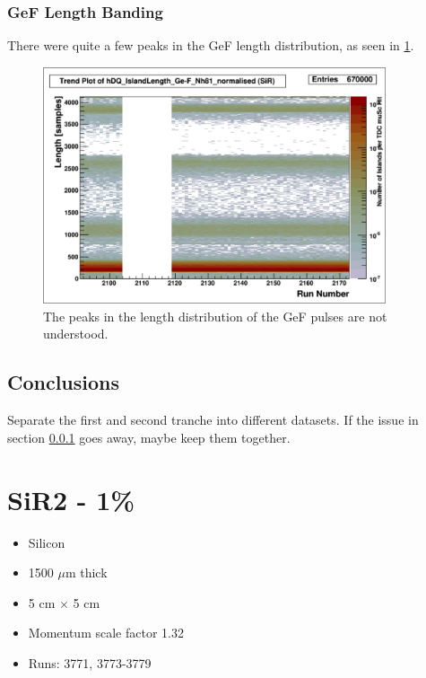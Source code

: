 \documentclass[a4paper]{article}
\begin{document}
\subsubsection{GeF Length Banding}
\label{sec:sir_gefbands}
There were quite a few peaks in the GeF length distribution, as seen in \ref{fig:sir_gef_length}.

\begin{figure}
  \centering
  \includegraphics[width=0.9\textwidth]{figs/sir/gef_length}
  \caption{The peaks in the length distribution of the GeF pulses
    are not understood.}
  \label{fig:sir_gef_length}
\end{figure}


\subsection{Conclusions}

Separate the first and second tranche into different datasets. If the issue in section \ref{sec:sir_gefbands}
goes away, maybe keep them together.



\section{SiR2 - 1\%}
\begin{itemize}
  \item Silicon
  \item 1500 $\mu$m thick
  \item 5 cm $\times$ 5 cm
  \item Momentum scale factor 1.32
  \item Runs:
    3771, 3773-3779
\end{itemize}
\end{document}
